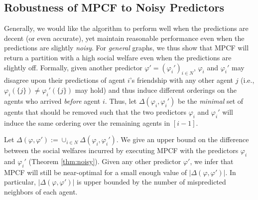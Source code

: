 \documentclass[letterpaper]{article}
\begin{document}
\subsection{Robustness of MPCF to Noisy Predictors}
\label{sec:MPCF with Noisy Predictors}
Generally, we would like the algorithm to perform well when the predictions are decent (or even accurate), yet maintain reasonable performance even when the predictions are slightly \textit{noisy}. For \textit{general} graphs, we thus show that MPCF will return a partition with a high social welfare even when the predictions are slightly off. Formally, given another predictor $\varphi' = (\varphi_i')_{i \in N}$, $\varphi_i$ and $\varphi_i'$ may disagree upon their predictions of agent $i$'s friendship with any other agent $j$ (i.e., $\varphi_i(\{j\}) \neq \varphi_i'(\{j\})$ may hold) and thus induce different orderings on the agents who arrived \textit{before} agent $i$. Thus, let $\Delta(\varphi_i,\varphi_i')$ be the \textit{minimal} set of agents that should be removed such that the two predictors $\varphi_i$ and $\varphi_i'$ will induce the same ordering over the remaining agents in $[i-1]$.

Let $\Delta(\varphi,\varphi') := \cup_{i \in N} \Delta(\varphi_i,\varphi_i')$. We give an upper bound on the difference between the social welfares incurred by executing MPCF with the predictors $\varphi_i$ and $\varphi_i'$ (Theorem \ref{thm:noisy}). Given any other predictor $\varphi'$, we infer that MPCF will still be near-optimal for a small enough value of $|\Delta(\varphi,\varphi')|$. In particular, $|\Delta(\varphi,\varphi')|$ is upper bounded by the number of mispredicted neighbors of each agent.
\end{document}
